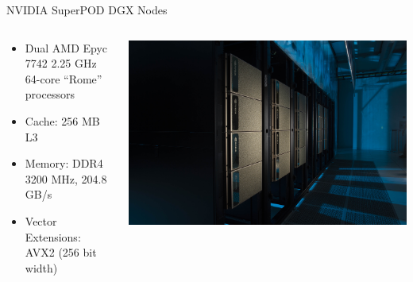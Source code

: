\begin{frame}{NVIDIA SuperPOD DGX Nodes}
\begin{columns}
\begin{column}{0.5\textwidth}
\begin{itemize}
\item Dual AMD Epyc 7742 2.25 GHz 64-core ``Rome'' processors
\item Cache: 256 MB L3
\item Memory: DDR4 3200 MHz, 204.8 GB/s
\item Vector Extensions: AVX2 (256 bit width)
\end{itemize}
\end{column}
\begin{column}{0.5\textwidth}
\begin{center}
\includegraphics[width=\textwidth]{figures/superpod.jpg}
\end{center}
\end{column}
\end{columns}
\end{frame}

